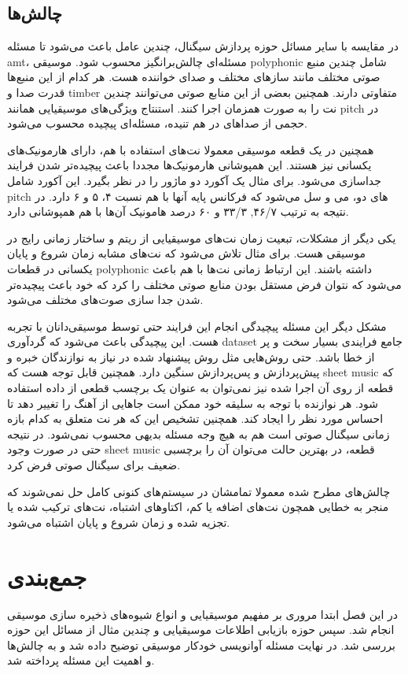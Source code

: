 \subsection{چالش‌ها}
در مقایسه با سایر مسائل حوزه پردازش سیگنال، چندین عامل باعث می‌شود تا مسئله
\gls{amt}، مسئله‌ای چالش‌برانگیز محسوب شود. موسیقی \gls{polyphonic} شامل چندین
منبع صوتی مختلف مانند ساز‌های مختلف و صدای خواننده هست. هر کدام از این منبع‌ها
قدرت صدا و \gls{timber} متفاوتی دارند. همچنین بعضی از این منابع صوتی می‌توانند
چندین نت را به صورت همزمان اجرا کنند. استنتاج ویژگی‌های موسیقیایی همانند
\gls{pitch} در حجمی از صداهای در هم تنیده، مسئله‌ای پیچیده محسوب می‌شود.

همچنین در یک قطعه موسیقی معمولا نت‌های استفاده با هم، دارای هارمونیک‌های یکسانی
نیز هستند. این همپوشانی هارمونیک‌ها مجددا باعث پیچیده‌تر شدن فرایند جداسازی
می‌شود. برای مثال یک آکورد دو ماژور را در نظر بگیرد. این آکورد شامل \gls{pitch}
های دو، می و سل می‌شود که فرکانس پایه آنها با هم نسبت ۴، ۵ و ۶ دارد. در نتیجه به
ترتیب ۴۶/۷, ۳۳/۳ و ۶۰ درصد هامونیک آن‌ها با هم همپوشانی دارد.

یکی دیگر از مشکلات، تبعیت زمان نت‌های موسیقیایی از ریتم و ساختار زمانی رایج در
موسیقی هست. برای مثال تلاش می‌شود که نت‌های مشابه زمان شروع و پایان یکسانی در
قطعات \gls{polyphonic} داشته باشند. این ارتباط زمانی نت‌ها با هم باعث می‌شود که
نتوان فرض مستقل بودن منابع صوتی مختلف را کرد که خود باعث پیچیده‌تر شدن جدا سازی
صوت‌های مختلف می‌شود.

مشکل دیگر این مسئله پیچیدگی انجام این فرایند حتی توسط موسیقی‌دانان با تجربه هست.
این پیچیدگی باعث می‌شود که گردآوری \gls{dataset} جامع فرایندی بسیار سخت و پر از
خطا باشد. حتی روش‌هایی مثل روش پیشنهاد شده در \cite{su2015escaping} نیاز به
نوازندگان خبره و پیش‌پردازش و پس‌پردازش سنگین دارد. همچنین قابل توجه هست که
\gls{sheet music} که قطعه از روی آن اجرا شده نیز نمی‌توان به عنوان یک برچسب قطعی
از داده استفاده شود. هر نوازنده با توجه به سلیقه خود ممکن است جاهایی از آهنگ را
تغییر دهد تا احساس مورد نظر را ایجاد کند. همچنین تشخیص این که هر نت متعلق به
کدام بازه زمانی سیگنال صوتی است هم به هیچ وجه مسئله‌ بدیهی محسوب نمی‌شود. در
نتیجه حتی در صورت وجود \gls{sheet music} قطعه، در بهترین حالت می‌توان آن را
برچسبی ضعیف برای سیگنال صوتی فرض کرد.

چالش‌های مطرح شده معمولا تمامشان در سیستم‌های کنونی کامل حل نمی‌شوند که منجر به
خطایی همچون نت‌های اضافه یا کم، اکتاوهای اشتباه، نت‌های ترکیب شده یا تجزیه شده و
زمان شروع و پایان اشتباه می‌شود.

\section{جمع‌بندی}
در این فصل ابتدا مروری بر مفهیم موسیقیایی و انواع شیوه‌های ذخیره سازی موسیقی
انجام شد. سپس حوزه بازیابی اطلاعات موسیقیایی و چندین مثال از مسائل این حوزه
بررسی شد. در نهایت مسئله آوانویسی خودکار موسیقی توضیح داده شد و به چالش‌ها و
اهمیت این مسئله پرداخته شد.